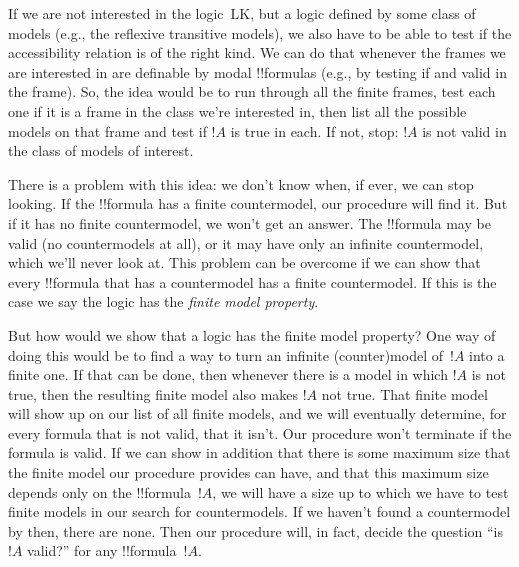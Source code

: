 \documentclass[10pt,a4paper]{article}
\theoremstyle{plain}
\theoremstyle{definition}
\theoremstyle{remark}
\providecommand{\Log}{\ensuremath{\mathrm{L}}}
\providecommand{\Ax}{\mathrm{Ax}}
\begin{document}
If we are not interested in the logic~\Log{K}, but a logic defined by
some class of models (e.g., the reflexive transitive models), we also
have to be able to test if the accessibility relation is of the right
kind. We can do that whenever the frames we are interested in are
definable by modal !!{formula}s (e.g., by testing if \Ax{T} and \Ax{4}
valid in the frame). So, the idea would be to run through all the
finite frames, test each one if it is a frame in the class we're
interested in, then list all the possible models on that frame and
test if $!A$ is true in each. If not, stop: $!A$ is not valid in the
class of models of interest.

There is a problem with this idea: we don't know when, if ever, we can
stop looking. If the !!{formula} has a finite countermodel, our procedure will
find it. But if it has no finite countermodel, we won't get an
answer. The !!{formula} may be valid (no countermodels at all), or it
may have only an infinite countermodel, which we'll never look at. This
problem can be overcome if we can show that every !!{formula} that has
a countermodel has a finite countermodel. If this is the case we say
the logic has the \emph{finite model property}.

But how would we show that a logic has the finite model property? One
way of doing this would be to find a way to turn an infinite
(counter)model of~$!A$ into a finite one. If that can be done, then
whenever there is a model in which $!A$ is not true, then the
resulting finite model also makes $!A$ not true. That finite model
will show up on our list of all finite models, and we will eventually
determine, for every formula that is not valid, that it isn't. Our
procedure won't terminate if the formula is valid. If we can show in
addition that there is some maximum size that the finite model our
procedure provides can have, and that this maximum size depends only
on the !!{formula}~$!A$, we will have a size up to which we have to
test finite models in our search for countermodels. If we haven't
found a countermodel by then, there are none. Then our procedure will,
in fact, decide the question ``is $!A$ valid?'' for any
!!{formula}~$!A$.
\end{document}
